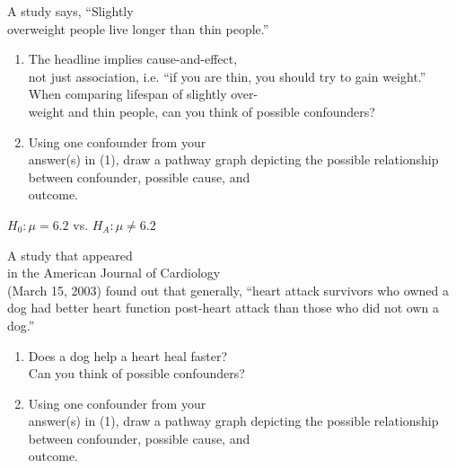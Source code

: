 \documentclass[11pt]{book}\usepackage[]{graphicx}\usepackage[]{color}
\begin{document}
\begin{exercises}
  \begin{exercise} %

A study says, ``Slightly \\ overweight people live longer than thin people.''

\begin{enumerate}
  \item The headline implies cause-and-effect, \\ not just association, i.e. ``if you are thin, you should try to gain weight.''  When comparing lifespan of slightly over- \\ weight and thin people, can you think of possible confounders?
  \item Using one confounder from your \\ answer(s) in (1), draw a pathway graph depicting the possible relationship between confounder, possible cause, and \\ outcome.
\end{enumerate}

	\end{exercise}
	\begin{solution}  %

	  $H_0: \mu = 6.2$ vs. $H_A: \mu \neq 6.2$
	\end{solution}

  \begin{exercise} %

A study that appeared \\ in the American Journal of Cardiology \\ (March 15, 2003) found out that generally, ``heart attack survivors who owned a dog had better heart function post-heart attack than those who did not own a dog.''

\begin{enumerate}
  \item Does a dog help a heart heal faster?  \\ Can you think of possible confounders?
  \item Using one confounder from your \\ answer(s) in (1), draw a pathway graph depicting the possible relationship between confounder, possible cause, and \\ outcome.
\end{enumerate}

	\end{exercise}


\end{exercises}
\end{document}
